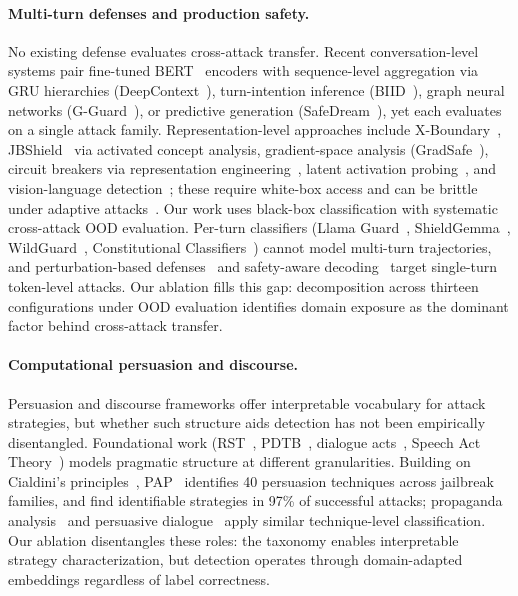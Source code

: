 \paragraph{Multi-turn defenses and production safety.}
No existing defense evaluates cross-attack transfer. Recent conversation-level systems pair fine-tuned BERT~\citep{devlin2019bert} encoders with sequence-level aggregation via GRU hierarchies (DeepContext~\citep{deepcontext2026}), turn-intention inference (BIID~\citep{tong2025biid}), graph neural networks (G-Guard~\citep{gguard2025}), or predictive generation (SafeDream~\citep{safedream2026}), yet each evaluates on a single attack family. Representation-level approaches include X-Boundary~\citep{lu2025xboundary}, JBShield~\citep{zhang2025jbshield} via activated concept analysis, gradient-space analysis (GradSafe~\citep{xie2024gradsafe}), circuit breakers via representation engineering~\citep{zou2024circuitbreakers}, latent activation probing~\citep{kulkarni2026latentadversarial,kadali2026trace}, and vision-language detection~\citep{hua2026rcs}; these require white-box access and can be brittle under adaptive attacks~\citep{derya2026revisitingjbshield}. Our work uses black-box classification with systematic cross-attack OOD evaluation. Per-turn classifiers (Llama Guard~\citep{inan2023llamaguard,metallamaguard3_2024}, ShieldGemma~\citep{zeng2024shieldgemma}, WildGuard~\citep{han2024wildguard}, Constitutional Classifiers~\citep{anthropic2025constitutional}) cannot model multi-turn trajectories, and perturbation-based defenses~\citep{robey2024smoothllm} and safety-aware decoding~\citep{xu2024safedecoding} target single-turn token-level attacks. Our ablation fills this gap: decomposition across thirteen configurations under OOD evaluation identifies domain exposure as the dominant factor behind cross-attack transfer.

\paragraph{Computational persuasion and discourse.}
Persuasion and discourse frameworks offer interpretable vocabulary for attack strategies, but whether such structure aids detection has not been empirically disentangled. Foundational work (RST~\citep{mann1988rst}, PDTB~\citep{prasad2008pdtb}, dialogue acts~\citep{stolcke2000dialogueact}, Speech Act Theory~\citep{austin1962speechacts,searle1969speechacts}) models pragmatic structure at different granularities. Building on Cialdini's principles~\citep{cialdini2001influence}, PAP~\citep{zeng2024pap} identifies 40 persuasion techniques across jailbreak families, and \citet{hagendorff2026reasoning} find identifiable strategies in 97\% of successful attacks; propaganda analysis~\citep{dasanmartino2019fine,dasanmartino2020semeval} and persuasive dialogue~\citep{wang2019persuasion} apply similar technique-level classification. Our ablation disentangles these roles: the taxonomy enables interpretable strategy characterization, but detection operates through domain-adapted embeddings regardless of label correctness.

